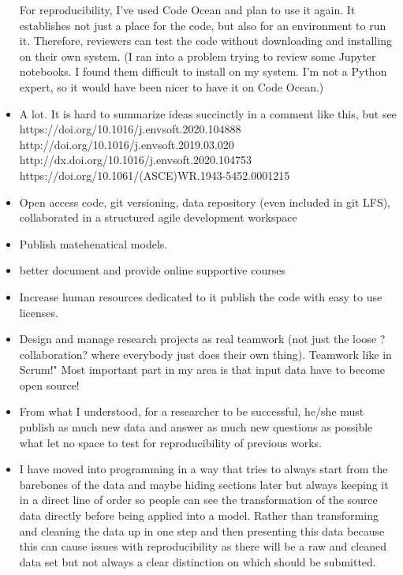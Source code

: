 \documentclass{article}
\begin{document}
\begin{itemize}
For reproducibility, I've used Code Ocean and plan to use it again. It establishes not just a place for the code, but also for an environment to run it. Therefore, reviewers can test the code without downloading and installing on their own system.
(I ran into a problem trying to review some Jupyter notebooks. I found them difficult to install on my system. I'm not a Python expert, so it would have been nicer to have it on Code Ocean.)
	\item A lot.  It is hard to summarize ideas succinctly in a comment like this, but see 
https://doi.org/10.1016/j.envsoft.2020.104888
http://doi.org/10.1016/j.envsoft.2019.03.020
http://dx.doi.org/10.1016/j.envsoft.2020.104753
https://doi.org/10.1061/(ASCE)WR.1943-5452.0001215
	\item Open access code, git versioning, data repository (even included in git LFS), collaborated in a structured agile development workspace
	\item Publish matehenatical models.
	\item better document and provide online supportive courses
	\item Increase human resources dedicated to it publish the code with easy to use licenses.
	\item Design and manage research projects as real teamwork (not just the loose ?collaboration? where everybody just does their own thing). Teamwork like in Scrum!"
Most important part in my area is that input data have to become open source!
	\item From what I understood, for a researcher to be successful, he/she must publish as much new data and answer as much new questions as possible what let no space to test for reproducibility of previous works.
	\item I have moved into programming in a way that tries to always start from the barebones of the data and maybe hiding sections later but always keeping it in a direct line of order so people can see the transformation of the source data directly before being applied into a model. Rather than transforming and cleaning the data up in one step and then presenting this data because this can cause issues with reproducibility as there will be a raw and cleaned data set but not always a clear distinction on which should be submitted.

\end{itemize}
\end{document}
